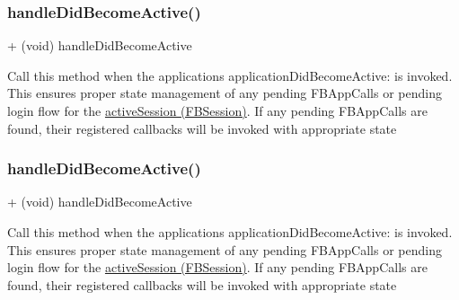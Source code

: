 \subsubsection{\texorpdfstring{handle\+Did\+Become\+Active()}{handleDidBecomeActive()}\hspace{0.1cm}{\footnotesize\ttfamily [2/5]}}
{\footnotesize\ttfamily + (void) handle\+Did\+Become\+Active \begin{DoxyParamCaption}{ }\end{DoxyParamCaption}}

Call this method when the application\textquotesingle{}s application\+Did\+Become\+Active\+: is invoked. This ensures proper state management of any pending F\+B\+App\+Calls or pending login flow for the \hyperlink{interfaceFBSession_aaf6863ab39e2f67733792453874d3870}{active\+Session (\+F\+B\+Session)}. If any pending F\+B\+App\+Calls are found, their registered callbacks will be invoked with appropriate state \mbox{\label{interfaceFBAppCall_ae38f6595e03e0ba2c44670e7ff579a70}} 
\subsubsection{\texorpdfstring{handle\+Did\+Become\+Active()}{handleDidBecomeActive()}\hspace{0.1cm}{\footnotesize\ttfamily [3/5]}}
{\footnotesize\ttfamily + (void) handle\+Did\+Become\+Active \begin{DoxyParamCaption}{ }\end{DoxyParamCaption}}

Call this method when the application\textquotesingle{}s application\+Did\+Become\+Active\+: is invoked. This ensures proper state management of any pending F\+B\+App\+Calls or pending login flow for the \hyperlink{interfaceFBSession_aaf6863ab39e2f67733792453874d3870}{active\+Session (\+F\+B\+Session)}. If any pending F\+B\+App\+Calls are found, their registered callbacks will be invoked with appropriate state \mbox{\label{interfaceFBAppCall_ae38f6595e03e0ba2c44670e7ff579a70}} 
